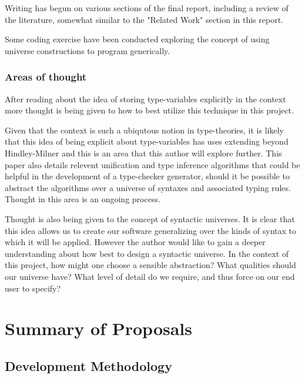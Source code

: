 \documentclass{ProgressReport}[2020/09/15]
\begin{document}
          Writing has begun on various sections of the final report,
          including a review of the literature, somewhat similar to
          the "Related Work" section in this report.

          Some coding exercise have been conducted exploring the
          concept of using universe constructions to program generically.
        
          \subsection{Areas of thought}

          After reading about the idea of storing type-variables
          explicitly in the context \cite{TypeInferenceInContext} more
          thought is being given to how to best utilize this technique
          in this project.
          
          Given that the context is such a ubiqutous notion in
          type-theories, it is likely that this idea of being
          explicit about type-variables has uses extending beyond
          Hindley-Milner and this is an area that this author will explore
          further. This paper also details relevent unification and type
          inference algorithms that could be helpful in the
          development of a type-checker generator, should it be
          possible to abstract the algorithms over a universe of
          syntaxes and associated typing rules. Thought in this area
          is an ongoing process.

          Thought is also being given to the concept of syntactic
          universes. It is clear that this idea allows us to create
          our software generalizing over the kinds of syntax to which it
          will be applied. However the author would like to gain a
          deeper understanding about how best to design a syntactic
          universe. In the context of this project, how might one
          choose a sensible abstraction? What qualities should our
          universe have? What level of detail do we require, and thus
          force on our end user to specify?

          
        \chapter{Summary of Proposals}
        \section{Development Methodology}
\end{document}

